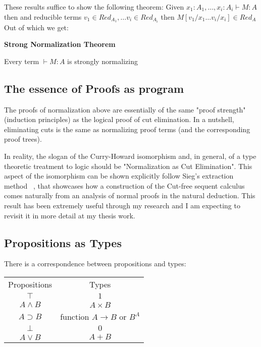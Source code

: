 These results suffice to show the following theorem:
Given $x_1:A_1, \ldots, x_i: A_i\vdash M: A$ then and reducible terms $v_1\in Red_{A_1},\ldots v_i\in Red_{A_i}$ then  $M[v_1/x_1\ldots v_i/x_i]\in Red_A$ 
Out of which we get:
\begin{mdframed}
 	\begin{theorem}
 		\textbf{Strong Normalization Theorem}

 			Every term $\vdash M:A$ is strongly normalizing

 		
 	\end{theorem}
 \end{mdframed}
 
\subsection{The essence of Proofs as program }
The proofs of normalization above are essentially of the same "proof strength" (induction principles) as the logical proof of cut elimination. In a nutshell, eliminating cuts is the same as normalizing proof terms (and the corresponding proof trees).

In reality, the slogan of the Curry-Howard isomorphism and, in general, of a type theoretic treatment to logic should be "Normalization as Cut Elimination". This aspect of the isomorphism can be shown explicitly follow Sieg's extraction method ~\cite{Sieg1998}, that  showcases how a construction of the Cut-free sequent calculus comes naturally from an analysis of normal proofs in the natural deduction. This result has been extremely useful through my research and I am expecting to revisit it in more detail at my thesis work.

 
\subsection{Propositions as Types}



There is a correspondence between propositions and types:
\begin{center}
  \begin{tabular}{@{} cc @{}}

    Propositions & Types \\

    $\top$ & $1$ \\
    $A\wedge B$ & $A\times B$ \\
    $A\supset B$ & function $A\to B$ or $B^A$ \\
    $\bot$ & $0$ \\
    $A\vee B$ & $A+B$\\

  \end{tabular}
\end{center}



